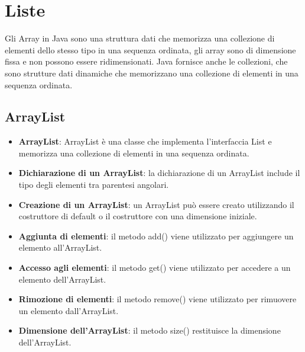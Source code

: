 \documentclass[11pt]{article}
\begin{document}
\section{Liste}
Gli Array in Java sono una struttura dati che memorizza una collezione di elementi dello stesso tipo in una sequenza ordinata,
gli array sono di dimensione fissa e non possono essere ridimensionati.
Java fornisce anche le collezioni, che sono strutture dati dinamiche che memorizzano una collezione di elementi in una sequenza ordinata.
\subsection{ArrayList}
\begin{itemize}
    \item \textbf{ArrayList}: ArrayList è una classe che implementa l'interfaccia List e memorizza una collezione di elementi in una sequenza ordinata.
    \item \textbf{Dichiarazione di un ArrayList}: la dichiarazione di un ArrayList include il tipo degli elementi tra parentesi angolari.
    \item \textbf{Creazione di un ArrayList}: un ArrayList può essere creato utilizzando il costruttore di default o il costruttore con una dimensione iniziale.
    \item \textbf{Aggiunta di elementi}: il metodo add() viene utilizzato per aggiungere un elemento all'ArrayList.
    \item \textbf{Accesso agli elementi}: il metodo get() viene utilizzato per accedere a un elemento dell'ArrayList.
    \item \textbf{Rimozione di elementi}: il metodo remove() viene utilizzato per rimuovere un elemento dall'ArrayList.
    \item \textbf{Dimensione dell'ArrayList}: il metodo size() restituisce la dimensione dell'ArrayList.
    \end{itemize}
\end{document}
